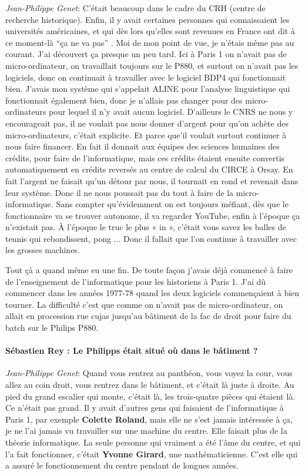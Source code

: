 \noindent\emph{Jean-Philippe Genet}: C'était beaucoup dans le cadre du CRH (centre de recherche historique). Enfin, il y avait certaines personnes qui connaissaient les universités américaines, et qui dès lors qu'elles sont revenues en France ont dit à ce moment-là \enquote{ça ne va pas} . Moi de mon point de vue, je n'étais même pas au courant. J'ai découvert ça presque un peu tard. Ici à Paris 1 on n’avait pas de micro-ordinateur, on travaillait toujours sur le P880, et surtout on n’avait pas les logiciels, donc on continuait à travailler avec le logiciel BDP4 qui fonctionnait bien. J'avais mon système qui s'appelait ALINE pour l'analyse linguistique qui fonctionnait également bien, donc je n'allais pas changer pour des micro-ordinateurs pour lequel il n'y avait aucun logiciel. D'ailleurs le CNRS ne nous y encourageait pas, il ne voulait pas nous donner d'argent pour qu'on achète des micro-ordinateurs, c'était explicite. Et parce que'il voulait surtout continuer à nous faire financer. En fait il donnait aux équipes des sciences humaines des crédits, pour faire de l'informatique, mais ces crédits étaient ensuite convertis automatiquement en crédits reversés au centre de calcul du CIRCE à Orsay. En fait l'argent ne faisait qu'un détour par nous, il tournait en rond et revenait dans leur système. Donc il ne nous poussait pas du tout à faire de la micro-informatique. Sans compter qu'évidemment on est toujours méfiant, dès que le fonctionnaire va se trouver autonome, il va regarder YouTube, enfin à l'époque ça n’existait pas. À l'époque le truc le plus « in », c'était vous savez les balles de tennis qui rebondissent, pong ... Donc il fallait que l'on continue à travailler avec les grosses machines.

Tout çà a quand même eu une fin. De toute façon j'avais déjà commencé à faire de l'enseignement de l'informatique pour les historiens à Paris 1. J'ai dû commencer dans les années 1977-78 quand les deux logiciels commençaient à bien tourner. La difficulté c'est que comme on n’avait pas de micro-ordinateur, on allait en procession rue cujas jusqu'au bâtiment de la fac de droit pour faire du batch sur le Philips P880.

\paragraph*{Sébastien Rey : Le Philipps était situé où dans le bâtiment ?}

\noindent\emph{Jean-Philippe Genet}: Quand vous rentrez au panthéon, vous voyez la cour, vous allez au coin droit, vous rentrez dans le bâtiment, et c'était là juste à droite. Au pied du grand escalier qui monte, c'était là, les trois-quatre pièces qui étaient là. Ce n’était pas grand.
Il y avait d'autres gens qui faisaient de l'informatique à Paris 1, par exemple \textbf{Colette Roland}, mais elle ne s'est jamais intéressée à ça, je ne l'ai jamais vu travailler sur une machine du centre. Elle faisait plus de la théorie informatique. La seule personne qui vraiment a été l'âme du centre, et qui l'a fait fonctionner, c'était \textbf{Yvonne Girard}, une mathématicienne. C'est elle qui a assuré le fonctionnement du centre pendant de longues années.

